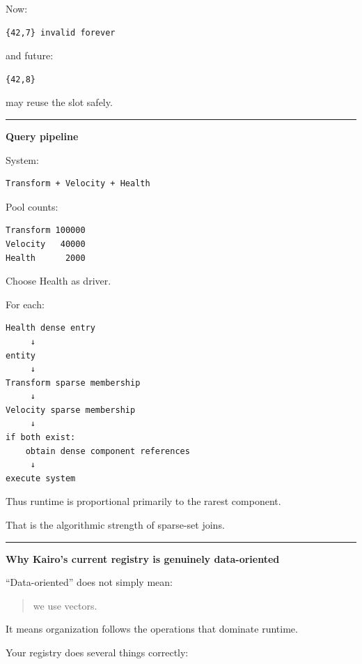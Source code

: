 Now:

\begin{verbatim}
{42,7} invalid forever
\end{verbatim}

and future:

\begin{verbatim}
{42,8}
\end{verbatim}

may reuse the slot safely.

\begin{center}\rule{0.5\linewidth}{0.5pt}\end{center}

\textbf{Query pipeline}

System:

\begin{verbatim}
Transform + Velocity + Health
\end{verbatim}

Pool counts:

\begin{verbatim}
Transform 100000
Velocity   40000
Health      2000
\end{verbatim}

Choose Health as driver.

For each:

\begin{verbatim}
Health dense entry
     ↓
entity
     ↓
Transform sparse membership
     ↓
Velocity sparse membership
     ↓
if both exist:
    obtain dense component references
     ↓
execute system
\end{verbatim}

Thus runtime is proportional primarily to the rarest component.

That is the algorithmic strength of sparse-set joins.

\begin{center}\rule{0.5\linewidth}{0.5pt}\end{center}

\textbf{Why Kairo's current registry is genuinely data-oriented}

``Data-oriented'' does not simply mean:

\begin{quote}
we use vectors.
\end{quote}

It means organization follows the operations that dominate runtime.

Your registry does several things correctly:

